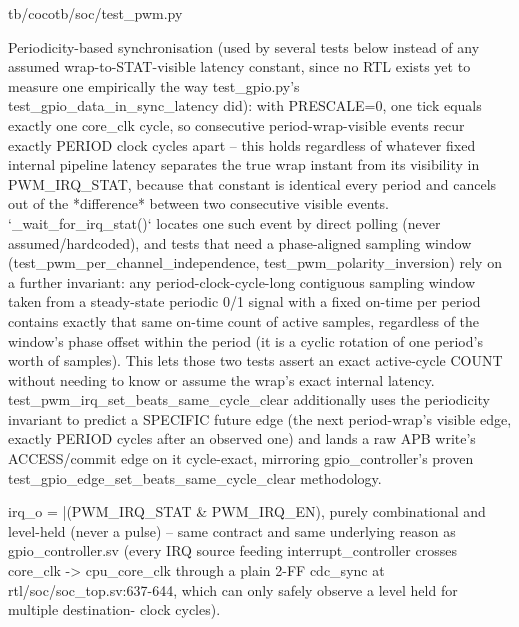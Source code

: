 \begin{relocated}{tb/cocotb/soc/test_pwm.py}
\begin{textblock}
Periodicity-based synchronisation (used by several tests below instead of any assumed
wrap-to-STAT-visible latency constant, since no RTL exists yet to measure one empirically the way
test_gpio.py's test_gpio_data_in_sync_latency did): with PRESCALE=0, one tick equals exactly one
core_clk cycle, so consecutive period-wrap-visible events recur exactly PERIOD clock cycles apart
-- this holds regardless of whatever fixed internal pipeline latency separates the true wrap
instant from its visibility in PWM_IRQ_STAT, because that constant is identical every period and
cancels out of the *difference* between two consecutive visible events. `_wait_for_irq_stat()`
locates one such event by direct polling (never assumed/hardcoded), and tests that need a
phase-aligned sampling window (test_pwm_per_channel_independence, test_pwm_polarity_inversion)
rely on a further invariant: any period-clock-cycle-long contiguous sampling window taken from a
steady-state periodic 0/1 signal with a fixed on-time per period contains exactly that same
on-time count of active samples, regardless of the window's phase offset within the period (it is
a cyclic rotation of one period's worth of samples). This lets those two tests assert an exact
active-cycle COUNT without needing to know or assume the wrap's exact internal latency.
test_pwm_irq_set_beats_same_cycle_clear additionally uses the periodicity invariant to predict a
SPECIFIC future edge (the next period-wrap's visible edge, exactly PERIOD cycles after an
observed one) and lands a raw APB write's ACCESS/commit edge on it cycle-exact, mirroring
gpio_controller's proven test_gpio_edge_set_beats_same_cycle_clear methodology.

irq_o = |(PWM_IRQ_STAT & PWM_IRQ_EN), purely combinational and level-held (never a pulse) -- same
contract and same underlying reason as gpio_controller.sv (every IRQ source feeding
interrupt_controller crosses core_clk -> cpu_core_clk through a plain 2-FF cdc_sync at
rtl/soc/soc_top.sv:637-644, which can only safely observe a level held for multiple destination-
clock cycles).


\end{textblock}
\end{relocated}
